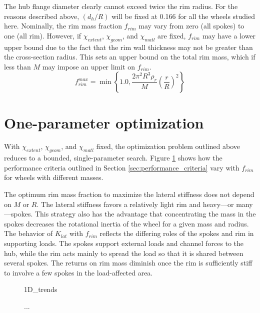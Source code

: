 \documentclass[\rootdir/thesis.tex]{subfiles}
\begin{document}
The hub flange diameter clearly cannot exceed twice the rim radius. For the reasons described above, $(d_h/R)$ will be fixed at 0.166 for all the wheels studied here. Nominally, the rim mass fraction $f_{rim}$ may vary from zero (all spokes) to one (all rim). However, if $\chi_{extent}$, $\chi_{geom}$, and $\chi_{matl}$ are fixed, $f_{rim}$ may have a lower upper bound due to the fact that the rim wall thickness may not be greater than the cross-section radius. This sets an upper bound on the total rim mass, which if less than $M$ may impose an upper limit on $f_{rim}$.
\begin{equation}
\label{eqn:frim_max}
f_{rim}^{max} = \min\left\lbrace 1.0, \frac{2\pi^2 R^3\rho_r}{M}\left(\frac{r}{R}\right)^2 \right\rbrace
\end{equation}

\section{One-parameter optimization}



With $\chi_{extent}$, $\chi_{geom}$, and $\chi_{matl}$ fixed, the optimization problem outlined above reduces to a bounded, single-parameter search. Figure \ref{fig:opt_1D_trends} shows how the performance criteria outlined in Section \ref{sec:performance_criteria} vary with $f_{rim}$ for wheels with different masses. 

The optimum rim mass fraction to maximize the lateral stiffness does not depend on $M$ or $R$. The lateral stiffness favors a relatively light rim and heavy---or many---spokes. This strategy also has the advantage that concentrating the mass in the spokes decreases the rotational inertia of the wheel for a given mass and radius. The behavior of $K_{lat}$ with $f_{rim}$ reflects the differing roles of the spokes and rim in supporting loads. The spokes support external loads and channel forces to the hub, while the rim acts mainly to spread the load so that it is shared between several spokes. The returns on rim mass diminish once the rim is sufficiently stiff to involve a few spokes in the load-affected area.


\begin{figure}
\centering
{1D_trends}
\caption{...}
\label{fig:opt_1D_trends}
\end{figure}

\inprogress
\end{document}
